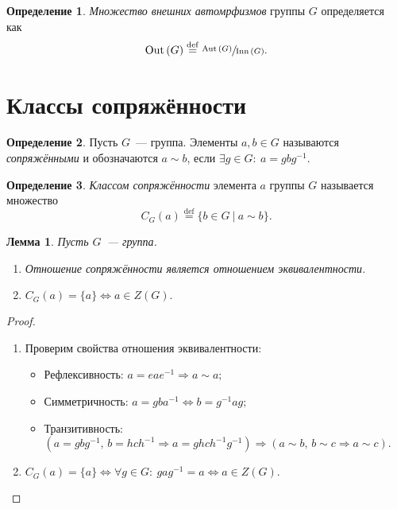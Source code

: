 \documentclass[a4paper, 14pt]{extarticle}
\newcommand{\deq}{\stackrel{\mathrm{def}}{=}}
\newcommand{\Aut}{\mathrm{Aut} \,}
\newcommand{\Inn}{\mathrm{Inn} \,}
\theoremstyle{definition}
\newtheorem{definition}{Определение}
\theoremstyle{plain}
\numberwithin{theorem}{section}
\numberwithin{definition}{section}
\numberwithin{statement}{section}
\newtheorem{lemma}{Лемма}
\numberwithin{lemma}{section}
\numberwithin{consequence}{section}
\begin{document}
          \begin{definition}
              \textit{Множество внешних автомрфизмов} группы $G$ определяется как\
              \begin{equation*}
                  \mathrm{Out}\,(G) \deq \sfrac{\Aut(G)}{\Inn(G)}.
              \end{equation*}
          \end{definition}
        \newpage
        \section{Классы сопряжённости}
        \setcounter{definition}{0}
        \begin{definition}
            Пусть $G$~--- группа. Элементы ${a,b \in G}$ называются \textit{сопряжёнными} и обозначаются ${a \sim b}$, если ${\exists g \in G{:} \ a = gbg^{-1}.}$
        \end{definition}
        \begin{definition}
            \textit{Классом сопряжённости} элемента $a$ группы $G$ называется множество
            \begin{equation*}
                C_G(a) \deq \{b \in G \ | \ a \sim b\}.
            \end{equation*}
        \end{definition}
        \begin{lemma}
            Пусть $G$~--- группа.
            \begin{enumerate}
            \setlength\itemsep{0.1em}
                \item Отношение сопряжённости является отношением эквивалентности.
                \item ${C_G(a) = \{a\} \Leftrightarrow a \in Z(G).}$
            \end{enumerate}
        \end{lemma}
        \begin{proof}
            \
            \begin{enumerate}
            
                \item Проверим свойства отношения эквивалентности:
                \begin{itemize}
                \setlength\itemsep{0.1em}
                    \item Рефлексивность: ${a = eae^{-1} \Rightarrow a \sim a;}$
                    \item Симметричность: ${a = gba^{-1} \Leftrightarrow b = g^{-1}ag;}$
                    \item Транзитивность: ${(a = gbg^{-1}, \, b = hch^{-1} \Rightarrow a = ghch^{-1}g^{-1}) \Rightarrow (a \sim b, \, b \sim c \Rightarrow a \sim c).}$
                \end{itemize}
                \item ${C_G(a) = \{a\} \Leftrightarrow \forall g \in G{:} \ gag^{-1} = a \Leftrightarrow a \in Z(G).}$ \qedhere
            \end{enumerate}
        \end{proof}
\end{document}
